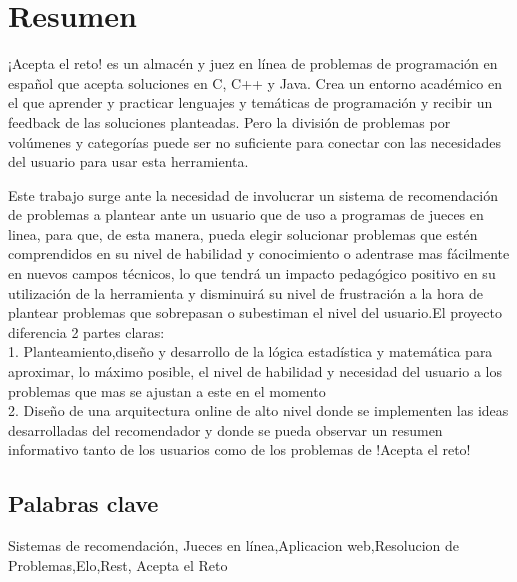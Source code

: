 \chapter*{Resumen}

¡Acepta el reto! es un almacén y juez en línea de problemas de programación en español que acepta soluciones en C, C++ y Java. Crea un entorno académico en el que aprender y practicar lenguajes y temáticas de programación y recibir un feedback de las soluciones planteadas. Pero la división de problemas por volúmenes y categorías puede ser no suficiente para conectar con las necesidades del usuario para usar esta herramienta.
 
Este trabajo surge ante la necesidad de involucrar un sistema de recomendación de problemas a plantear ante un usuario que de uso a programas de jueces en linea, para que, de esta manera,   pueda elegir solucionar problemas que estén comprendidos en su nivel de habilidad y conocimiento o adentrase mas fácilmente en nuevos campos técnicos, lo que tendrá un impacto pedagógico positivo en su utilización de la herramienta y disminuirá su nivel de frustración a la hora de plantear problemas que sobrepasan o subestiman el nivel del usuario.El proyecto diferencia 2 partes claras: \\

	1. Planteamiento,diseño y desarrollo de la lógica estadística y matemática para aproximar, lo máximo posible, el nivel de habilidad y necesidad del usuario a los problemas que mas se ajustan a este en el momento \\
	
	2. Diseño de una arquitectura online de alto nivel donde se implementen las ideas desarrolladas del recomendador y donde se pueda observar un resumen informativo tanto de los usuarios como de los problemas de !Acepta el reto! \\
	

\section*{Palabras clave}
   
\noindent Sistemas de recomendación, Jueces en línea,Aplicacion web,Resolucion de Problemas,Elo,Rest, Acepta el Reto

   


